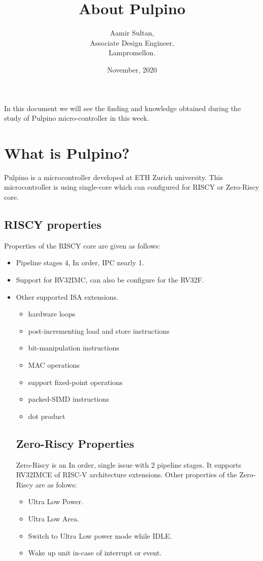 \documentclass[a4paper,12pt]{article}
\title{\bfseries About Pulpino}
\author{Aamir Sultan,\\Associate Design Engineer,\\Lampromellon.}
\date{November, 2020}
\begin{document}
	\maketitle
	
		
	In this document we will see the finding and knowledge obtained during the study of Pulpino micro-controller in this week.
	\section{What is Pulpino?}
	Pulpino is a microcontroller developed at ETH Zurich university\cite{pulp_ref}. This microcontroller is using single-core which can configured for RISCY or Zero-Riscy core. 
	\subsection{RISCY properties}
	Properties of the RISCY core are given as follows:
	
	\begin{itemize}
		\item Pipeline stages 4, In order, IPC nearly 1.
		\item Support for RV32IMC, can also be configure for the RV32F.
		\item Other supported ISA extensions.
		
		\begin{itemize}
			
			\item hardware loops
			\item post-incrementing load and store instructions
			\item bit-manipulation instructions
			\item MAC operations
			\item support fixed-point operations
			\item packed-SIMD instructions
			\item dot product
		\end{itemize}
	
	\subsection{Zero-Riscy Properties}
		Zero-Riscy is an In order, single issue with 2 pipeline stages. It supports RV32IMCE of RISC-V architecture extensions. Other properties of the Zero-Riscy are as folows:
		\begin{itemize}
			\item Ultra Low Power.
			\item Ultra Low Area.
			\item Switch to Ultra Low power mode while IDLE.
			\item Wake up unit in-case of interrupt or event.
		\end{itemize} 
	\end{itemize}
\end{document}
